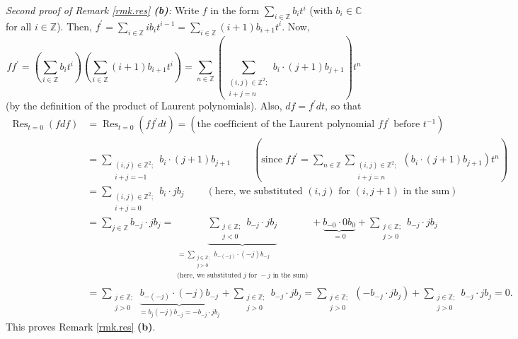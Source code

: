 \documentclass
[numbers=enddot,12pt,final,onecolumn,german,notitlepage]{scrartcl}%
\theoremstyle{definition}
\begin{document}
\textit{Second proof of Remark \ref{rmk.res} \textbf{(b)}:} Write $f$ in the
form $\sum\limits_{i\in\mathbb{Z}}b_{i}t^{i}$ (with $b_{i}\in\mathbb{C}$ for
all $i\in\mathbb{Z}$). Then, $f^{\prime}=\sum\limits_{i\in\mathbb{Z}}%
ib_{i}t^{i-1}=\sum\limits_{i\in\mathbb{Z}}\left(  i+1\right)  b_{i+1}t^{i}$.
Now,%
\[
ff^{\prime}=\left(  \sum\limits_{i\in\mathbb{Z}}b_{i}t^{i}\right)  \left(
\sum\limits_{i\in\mathbb{Z}}\left(  i+1\right)  b_{i+1}t^{i}\right)
=\sum\limits_{n\in\mathbb{Z}}\left(  \sum\limits_{\substack{\left(
i,j\right)  \in\mathbb{Z}^{2};\\i+j=n}}b_{i}\cdot\left(  j+1\right)
b_{j+1}\right)  t^{n}%
\]
(by the definition of the product of Laurent polynomials). Also,
$df=f^{\prime}dt$, so that%
\begin{align*}
\operatorname*{Res}\nolimits_{t=0}\left(  fdf\right)   &  =\operatorname*{Res}%
\nolimits_{t=0}\left(  ff^{\prime}dt\right)  =\left(  \text{the coefficient of
the Laurent polynomial }ff^{\prime}\text{ before }t^{-1}\right) \\
&  =\sum\limits_{\substack{\left(  i,j\right)  \in\mathbb{Z}^{2}%
;\\i+j=-1}}b_{i}\cdot\left(  j+1\right)  b_{j+1}\ \ \ \ \ \ \ \ \ \ \left(
\text{since }ff^{\prime}=\sum\limits_{n\in\mathbb{Z}}\sum
\limits_{\substack{\left(  i,j\right)  \in\mathbb{Z}^{2};\\i+j=n}}\left(
b_{i}\cdot\left(  j+1\right)  b_{j+1}\right)  t^{n}\right) \\
&  =\sum\limits_{\substack{\left(  i,j\right)  \in\mathbb{Z}^{2}%
;\\i+j=0}}b_{i}\cdot jb_{j}\ \ \ \ \ \ \ \ \ \ \left(  \text{here, we
substituted }\left(  i,j\right)  \text{ for }\left(  i,j+1\right)  \text{ in
the sum}\right) \\
&  =\sum\limits_{j\in\mathbb{Z}}b_{-j}\cdot jb_{j}=\underbrace{\sum
\limits_{\substack{j\in\mathbb{Z};\\j<0}}b_{-j}\cdot jb_{j}}_{\substack{=\sum
\limits_{\substack{j\in\mathbb{Z};\\j>0}}b_{-\left(  -j\right)  }\cdot\left(
-j\right)  b_{-j}\\\text{(here, we substituted }j\text{ for }-j\text{ in the
sum)}}}+\underbrace{b_{-0}\cdot0b_{0}}_{=0}+\sum\limits_{\substack{j\in
\mathbb{Z};\\j>0}}b_{-j}\cdot jb_{j}\\
&  =\sum\limits_{\substack{j\in\mathbb{Z};\\j>0}}\underbrace{b_{-\left(
-j\right)  }\cdot\left(  -j\right)  b_{-j}}_{=b_{j}\left(  -j\right)
b_{-j}=-b_{-j}\cdot jb_{j}}+\sum\limits_{\substack{j\in\mathbb{Z}%
;\\j>0}}b_{-j}\cdot jb_{j}=\sum\limits_{\substack{j\in\mathbb{Z}%
;\\j>0}}\left(  -b_{-j}\cdot jb_{j}\right)  +\sum\limits_{\substack{j\in
\mathbb{Z};\\j>0}}b_{-j}\cdot jb_{j}=0.
\end{align*}
This proves Remark \ref{rmk.res} \textbf{(b)}.
\end{document}
